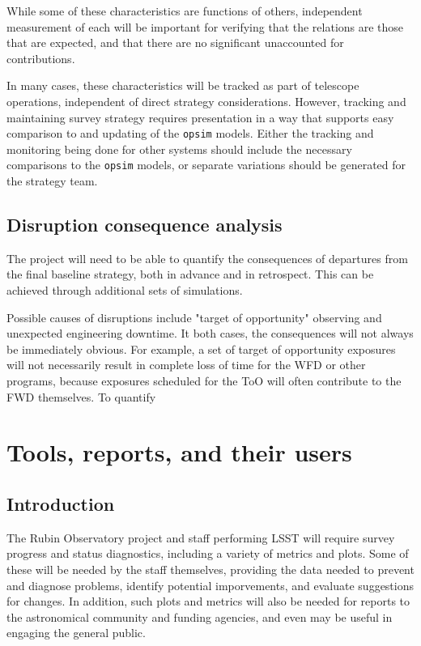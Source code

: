 While some of these characteristics are functions of others, independent measurement of each will be important for verifying that the relations are those that are expected, and that there are no significant unaccounted for contributions.

In many cases, these characteristics will be tracked as part of telescope operations, independent of direct strategy considerations.
However, tracking and maintaining survey strategy requires presentation in a way that supports easy comparison to and updating of the \texttt{opsim} models.
Either the tracking and monitoring being done for other systems should include the necessary comparisons to the \texttt{opsim} models, or separate variations should be generated for the strategy team.

\subsection{Disruption consequence analysis}
\label{sec:org5fdac8d}
The project will need to be able to quantify the consequences of departures from the final baseline strategy, both in advance and in retrospect. This can be achieved through additional sets of simulations.

Possible causes of disruptions include "target of opportunity" observing and unexpected engineering downtime. 
It both cases, the consequences will not always be immediately obvious.
For example, a set of target of opportunity exposures will not necessarily result in complete loss of time for the WFD or other programs, because exposures scheduled for the ToO will often contribute to the FWD themselves. 
To quantify 

\section{Tools, reports, and their users}
\label{sec:org6a9307c}
\subsection{Introduction}
\label{sec:orge57157f}
The Rubin Observatory project and staff performing LSST will require survey progress and status diagnostics, including a variety of metrics and plots.
Some of these will be needed by the staff themselves, providing the data needed to prevent and diagnose problems, identify potential imporvements, and evaluate suggestions for changes.
In addition, such plots and metrics will also be needed for reports to the astronomical community and funding agencies, and even may be useful in engaging the general public.

